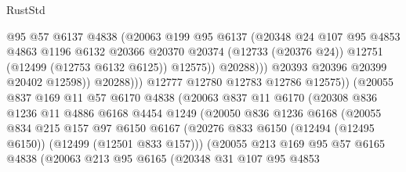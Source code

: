 \begin{lexlean}{RustStd}
\begin{coremodule}
{\begin{coremodule}
{{{{{{{{{{{{{{{{{{{{{{{{{{{{{{{{{{{{{{{{{{{{{{{{{{{{{{{{{{{{{{{{{{{{{{{{{{{{{{{{                                @95
                                @57
                                @6137
                                @4838
                                (@20063
                                  @199
                                  @95
                                  @6137
                                  (@20348
                                    @24
                                    @107
                                    @95
                                    @4853
                                    @4863
                                    @1196
                                    @6132
                                    @20366
                                    @20370
                                    @20374
                                    (@12733 (@20376 @24))
                                    @12751
                                    (@12499 (@12753 @6132 @6125))
                                    @12575))
                                @20288)))
                          @20393
                          @20396
                          @20399
                          @20402
                          @12598))
                      @20288)))
                @12777
                @12780
                @12783
                @12786
                @12575))
            (@20055
              @837
              @169
              @11
              @57
              @6170
              @4838
              (@20063
                @837
                @11
                @6170
                (@20308
                  @836
                  @1236
                  @11
                  @4886
                  @6168
                  @4454
                  @1249
                  (@20050
                    @836
                    @1236
                    @6168
                    (@20055
                      @834
                      @215
                      @157
                      @97
                      @6150
                      @6167
                      (@20276 @833 @6150 (@12494 (@12495 @6150)) (@12499 (@12501 @833 @157)))
                      (@20055
                        @213
                        @169
                        @95
                        @57
                        @6165
                        @4838
                        (@20063
                          @213
                          @95
                          @6165
                          (@20348
                            @31
                            @107
                            @95
                            @4853
}}}}}}}}}}}}}}}}}}}}}}}}}}}}}}}}}}}}}}}}}}}}}}}}}}}}}}}}}}}}}}}}}}}}}}}}}}}}}}}}
\end{coremodule}}
\end{coremodule}
\end{lexlean}
